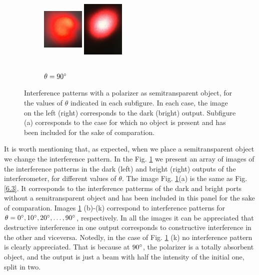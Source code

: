\documentclass[12pt]{book}
\begin{document}
\begin{figure}[H]
\begin{subfigure}[b]{0.3\linewidth}
\centering
\includegraphics[width=2cm,height=3.5cm]{images/fotos/111.jpg}
\includegraphics[width=2cm,height=3.5cm]{images/fotos/12.jpg}
\caption{$\theta=90\degree$}
\end{subfigure}

\caption{ Interference patterns with a polarizer as semitransparent object, for the values of $\theta$ indicated in each subfigure. In each case, the image on the left (right) corresponds to the dark (bright) output. Subfigure (a) corresponds to the case for which no object is present and has been included for the sake of comparation.}
\label{intensities2222}
\end{figure}

\pagebreak

It is worth mentioning that, as expected, when we place a  semitransparent object we change the interference pattern. In the Fig. \ref{intensities2222} we present an array of images of the interference patterns in the dark (left) and bright (right) outputs of the interferometer, for different values of $\theta$. The image Fig. \ref{intensities2222}(a) is the same as Fig. \ref{6.3}. It corresponds to the interference patterms of the dark and bright ports without a semitransparent object and has been included in this panel for the sake of comparation. Images \ref{intensities2222} (b)-(k) correspond to interference patterns for $\theta=0\degree,10\degree,20\degree,\dots,90\degree$, respectively. In all the images it can be appreciated that destructive interference in one output corresponds to constructive interference in the other and viceversa. Notedly, in the case of Fig. \ref{intensities2222} (k) no interference pattern is clearly appreciated. That is because at $90\degree$, the polarizer is a totally absorbent object,  and the output is just a beam with half the intensity of the initial one, split in two.
\end{document}
